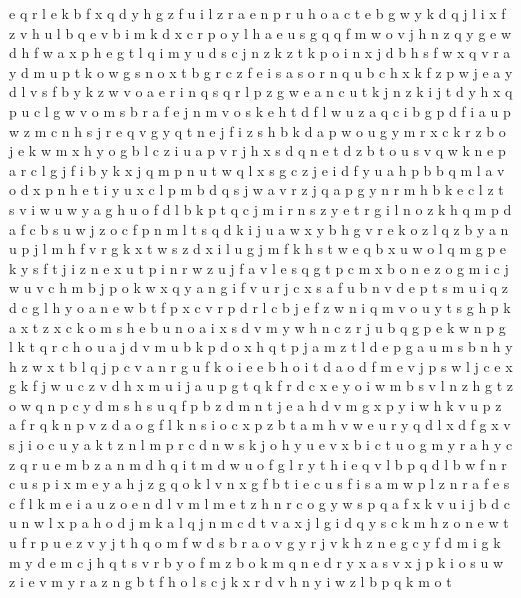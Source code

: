 \documentclass{article}
\begin{document}
e q
r l e k b f x q d y h g z
f u i l z r a e
n p r u h o a c t e b g w y k d q j l i x f z v
h u l b q e
v b i m k d x c r p o y l h a e u s g q
q f m w o v j h n
z q y g e w d h
f w a x p h e g t l q i m y u d s c j n z k
z t k p o i n x j d b h s f w
x q v r a y d m u p t k o w g s n
o x t b g r c z f e i s a
s o r n q u b c h x k f z p w j e a y d l v
s f b y k z w v o a e r i n q
s q r l p z g w e a n c u t k j
n z k i j t d y h x q p u c l g w v o m s b r a f e
j n m v o s k e h t d f l w u z a q c i b g p
d f i a u p w z m c n h s j r e q v g y
q t n e j f i z s h b k d a p w o u g y m r x c
k
r
z b o j e k w m x h
y o g b l c z i u a p v r j h x s d q n e t
d z b t o u s v q w k n e p a r c l g j f i
b y k x j q m p n u
t w q l x s g c z j e i d f y u a h p b
b q m l
a v o d x p
n h e t i y u x c l p m b d q s j w a v r z
j q a p g y n r m h b k e c l z t s v i w u
w y a g h u o f d l b k p t q c j m i r n s z
y e t r g i l n o z k h q m p d a f c b s u
w j
z o c f p n m l t s q d k i j u a w x y b h g v r e
k o z l
q z b y a n u p j l m h f v r g k x t w s
z d x i l u g j m f k h s t w e q
b x u w o l q m g p e k y s f t j i z n
e x u t p
i n r w z u j f a v l e s q g t p c m x b o
n e z o g m i c j w u v
c h m b j p o k w x q y a n g i f v u
r j c x s a f u b n v d e p t
s m u i q z d c g l h y o a n e w b t f p x
c v r p
d r l c b j e f z w n i q m v o u y t s g h p k a x
t z x c k o m s h e b u n
o a i x s d v m y w h n c z r j u b q g p e k
w n p g l k t q r c h o u a j d
v m u b k p d o x
h q t p j a m
z t l d e p g a u m s b n h y
h z w x t b l q j p c v a n r g u f k o i e
e b h o i t d
a o d f m e v j p
s w l j c e x
g k f j w u c z v d h x m
u i
j a u p g t q k f r d c x e y o i w m b s v l n z h
g t z o w q n p c y d m s
h s u q f p b z d m n t j e a
h d
v m g x p y
i w h k v u p z a f r q
k n p v z d a o
g f l k n s i o c x p z b t a m h v w e u r y q
d l x
d f g x v s j i o c u y a k t z n l
m p r c d n w s k j o h y u e v x b i
c t u o g m y r a h
y
c z q r u e m b
z a n m d h q
i t m d w u o f g l r
y t h i e q v l b p
q d l b w f n r c u s p i x m e y a h j z g
q o k l v n x g f b t i e c u s
f i s a m w p l
z n r a f e s c
f l k m e i a u
z o e n d l v m
l m e t z h n r c o g y w s p q a f x k v u i j b d
c u n w l x p a h o d j
m
k a l q j n m c d t
v a x j l g i d q y s c k m h z o n e w t u f r p
u e z v y j t h q o m f w d s b r
a o v g y r j
v k h z n e g c y f d m
i g k m y d
e m
c j h q
t s v r b y o f m
z b o k m q n e d r y x a s v
x j p k i o s u w z
i e v m y r a z n g b t f h o l s c j k x
r d v h n y i w z l b p q k m o t
\end{document}
